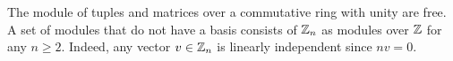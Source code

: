 \begin{example}
  The module of tuples and matrices over a commutative ring with unity are free.
  A set of modules that do not have a basis consists of $\mathbb{Z}_n$ as modules over
  $\mathbb{Z}$ for any $n \geq 2$.
  Indeed, any vector $v \in \mathbb{Z}_n$ is linearly independent since $n v = 0$.
\end{example}
